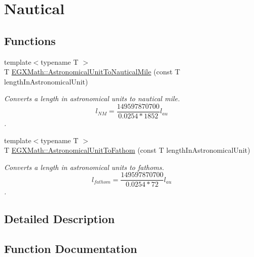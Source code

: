 \hypertarget{group___e_g_x_math-_conversions-_length_conversions-_astronomical-_astronomical_unit-_nautical}{}\section{Nautical}
\label{group___e_g_x_math-_conversions-_length_conversions-_astronomical-_astronomical_unit-_nautical}
\subsection*{Functions}
\begin{DoxyCompactItemize}
\item 
{\footnotesize template$<$typename T $>$ }\\T \mbox{\hyperlink{group___e_g_x_math-_conversions-_length_conversions-_astronomical-_astronomical_unit-_nautical_ga1d18851a119546f6a8e95e3051559f2e}{E\+G\+X\+Math\+::\+Astronomical\+Unit\+To\+Nautical\+Mile}} (const T length\+In\+Astronomical\+Unit)
\begin{DoxyCompactList}\small\item\em Converts a length in astronomical units to nautical mile. \[ l_{NM}= \frac{149597870700}{0.0254 * 1852} l_{au} \]. \end{DoxyCompactList}\item 
{\footnotesize template$<$typename T $>$ }\\T \mbox{\hyperlink{group___e_g_x_math-_conversions-_length_conversions-_astronomical-_astronomical_unit-_nautical_ga160015df7b4feb28baa02d92a7f43d5c}{E\+G\+X\+Math\+::\+Astronomical\+Unit\+To\+Fathom}} (const T length\+In\+Astronomical\+Unit)
\begin{DoxyCompactList}\small\item\em Converts a length in astronomical units to fathoms. \[ l_{fathom}= \frac{149597870700}{0.0254 * 72} l_{au} \]. \end{DoxyCompactList}\end{DoxyCompactItemize}


\subsection{Detailed Description}


\subsection{Function Documentation}
\mbox{\label{group___e_g_x_math-_conversions-_length_conversions-_astronomical-_astronomical_unit-_nautical_ga160015df7b4feb28baa02d92a7f43d5c}} 
